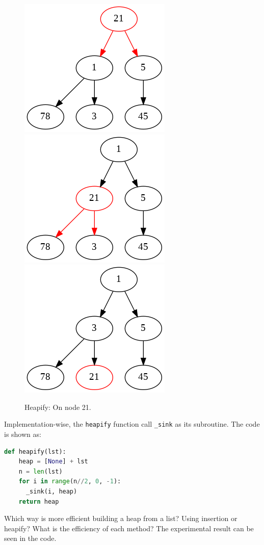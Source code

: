 \documentclass[../main.tex]{subfiles}
\begin{document}
\begin{figure}[h!]
    \includegraphics[width = 0.3\columnwidth]{fig/min_heap_heapify_5.png}
    \includegraphics[width = 0.3\columnwidth]{fig/min_heap_heapify_6.png}
    \includegraphics[width = 0.3\columnwidth]{fig/min_heap_heapify_7.png}
    \caption{Heapify: On node 21.}
    \label{fig:heapify}
\end{figure}

Implementation-wise, the \texttt{heapify} function call \texttt{\_sink} as its subroutine. The code is shown as:
\begin{lstlisting}[language=Python]
def heapify(lst):
    heap = [None] + lst
    n = len(lst)
    for i in range(n//2, 0, -1):
      _sink(i, heap)
    return heap
\end{lstlisting}

\begin{bclogo}[couleur = blue!30, arrondi=0.1,logo=\bccrayon,ombre=true]{Which way is more efficient building a heap from a list?} Using insertion or heapify? What is the efficiency of each method? The experimental result can be seen in the code.
\end{bclogo}
\end{document}
